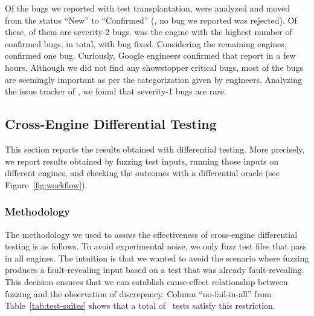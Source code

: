 \documentclass[10pt,conference,anonymous]{IEEEtran}
\begin{document}
Of the  bugs we reported with test transplantation, 
were analyzed and moved from the status ``New'' to ``Confirmed''
(\ie{}, no bug we reported was rejected). Of these,  of them
are severity-2 bugs.  \chakra{} was the engine with the highest number
of confirmed bugs,  in total, with  bug
fixed. Considering the remaining engines, \veight{} confirmed one
bug. Curiously, Google engineers confirmed that report in a few
hours. Although we did not find any showstopper critical bugs, most of
the bugs are seemingly important as per the categorization given by
engineers. Analyzing the issue tracker of \chakra, we found that
severity-1 bugs are rare.


\subsection{Cross-Engine Differential Testing}
\label{sec:cross-engine-diff-testing-results}

This section reports the results obtained with differential
testing. More precisely, we report results obtained by fuzzing test
inputs, running those inputs on different engines, and checking the
outcomes with a differential oracle (see Figure~\ref{fig:workflow}).

\subsubsection{Methodology}
The methodology we used to assess the effectiveness of cross-engine
differential testing is as follows. To avoid experimental noise, we
only fuzz test files that pass in all engines. The intuition is that
we wanted to avoid the scenario where fuzzing produces a
fault-revealing input based on a test that was already
fault-revealing. This decision ensures that we can establish
cause-effect relationship between fuzzing and the observation of
discrepancy. Column ``no-fail-in-all'' from
Table~\ref{tab:test-suites} shows that a total of
\totalTestFilesPassInAll\ tests satisfy this restriction.
\end{document}
